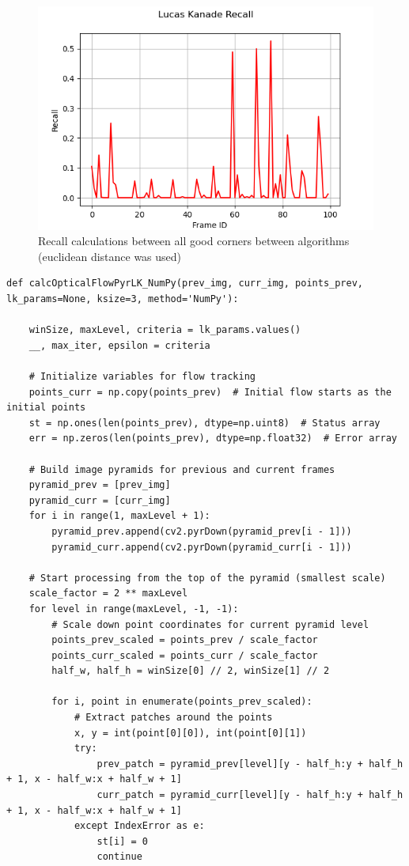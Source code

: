 \documentclass[11pt, conference, letterpaper]{IEEEtran}
\begin{document}
\begin{figure}[t]
    \centering
    \includegraphics[width=0.45\linewidth]{images/lk_recall.png}
    \caption{Recall calculations between all good corners between algorithms (euclidean distance was used)}
    \label{fig:lk-rec}
\end{figure}


\onecolumn
\begin{lstlisting}[style=python, caption={\texttt{calcOpticalFlowPyrLK\_NumPy}}, label={lst:calcOpticalFlowPyrLK}]
    def calcOpticalFlowPyrLK_NumPy(prev_img, curr_img, points_prev, lk_params=None, ksize=3, method='NumPy'):

    winSize, maxLevel, criteria = lk_params.values()
    __, max_iter, epsilon = criteria
    
    # Initialize variables for flow tracking
    points_curr = np.copy(points_prev)  # Initial flow starts as the initial points
    st = np.ones(len(points_prev), dtype=np.uint8)  # Status array
    err = np.zeros(len(points_prev), dtype=np.float32)  # Error array

    # Build image pyramids for previous and current frames
    pyramid_prev = [prev_img]
    pyramid_curr = [curr_img]
    for i in range(1, maxLevel + 1):
        pyramid_prev.append(cv2.pyrDown(pyramid_prev[i - 1]))
        pyramid_curr.append(cv2.pyrDown(pyramid_curr[i - 1]))

    # Start processing from the top of the pyramid (smallest scale)
    scale_factor = 2 ** maxLevel
    for level in range(maxLevel, -1, -1):
        # Scale down point coordinates for current pyramid level
        points_prev_scaled = points_prev / scale_factor
        points_curr_scaled = points_curr / scale_factor
        half_w, half_h = winSize[0] // 2, winSize[1] // 2

        for i, point in enumerate(points_prev_scaled):
            # Extract patches around the points
            x, y = int(point[0][0]), int(point[0][1])
            try:
                prev_patch = pyramid_prev[level][y - half_h:y + half_h + 1, x - half_w:x + half_w + 1]
                curr_patch = pyramid_curr[level][y - half_h:y + half_h + 1, x - half_w:x + half_w + 1]
            except IndexError as e:
                st[i] = 0
                continue


\end{lstlisting}
\end{document}
